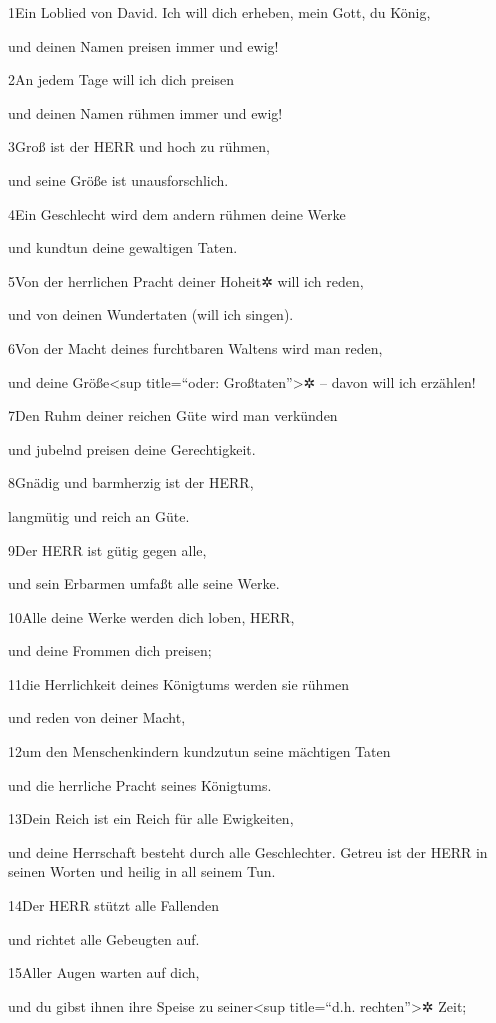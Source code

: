 1Ein Loblied von David. Ich will dich erheben, mein Gott, du König,

und deinen Namen preisen immer und ewig!

2An jedem Tage will ich dich preisen

und deinen Namen rühmen immer und ewig!

3Groß ist der HERR und hoch zu rühmen,

und seine Größe ist unausforschlich.

4Ein Geschlecht wird dem andern rühmen deine Werke

und kundtun deine gewaltigen Taten.

5Von der herrlichen Pracht deiner Hoheit✲ will ich reden,

und von deinen Wundertaten (will ich singen).

6Von der Macht deines furchtbaren Waltens wird man reden,

und deine Größe\textless sup title=``oder: Großtaten''\textgreater✲ --
davon will ich erzählen!

7Den Ruhm deiner reichen Güte wird man verkünden

und jubelnd preisen deine Gerechtigkeit.

8Gnädig und barmherzig ist der HERR,

langmütig und reich an Güte.

9Der HERR ist gütig gegen alle,

und sein Erbarmen umfaßt alle seine Werke.

10Alle deine Werke werden dich loben, HERR,

und deine Frommen dich preisen;

11die Herrlichkeit deines Königtums werden sie rühmen

und reden von deiner Macht,

12um den Menschenkindern kundzutun seine mächtigen Taten

und die herrliche Pracht seines Königtums.

13Dein Reich ist ein Reich für alle Ewigkeiten,

und deine Herrschaft besteht durch alle Geschlechter. Getreu ist der
HERR in seinen Worten und heilig in all seinem Tun.

14Der HERR stützt alle Fallenden

und richtet alle Gebeugten auf.

15Aller Augen warten auf dich,

und du gibst ihnen ihre Speise zu seiner\textless sup title=``d.h.
rechten''\textgreater✲ Zeit;

